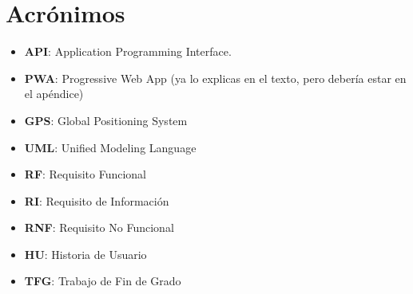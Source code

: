 \chapter{Acrónimos}\label{cap:acronimos}


\begin{itemize}

\item \textbf{API}: Application Programming Interface.
\item \textbf{PWA}: Progressive Web App (ya lo explicas en el texto, pero debería estar en el apéndice)
\item \textbf{GPS}: Global Positioning System
\item \textbf{UML}: Unified Modeling Language
\item \textbf{RF}: Requisito Funcional
\item \textbf{RI}: Requisito de Información
\item \textbf{RNF}: Requisito No Funcional
\item \textbf{HU}: Historia de Usuario
\item \textbf{TFG}: Trabajo de Fin de Grado





\end{itemize}